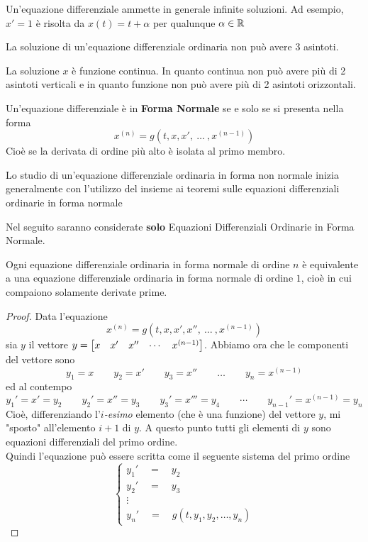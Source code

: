 \begin{example}
	\label{ex:eq_diff_inf_sol}
	Un'equazione differenziale ammette in generale infinite soluzioni. Ad esempio, $x' = 1$ è risolta da $x(t) = t + \alpha$ per qualunque $\alpha \in \mathbb{R}$
\end{example}
\begin{exercise}
	La soluzione di un'equazione differenziale ordinaria non può avere 3 asintoti.
	\begin{solution}
		La soluzione $x$ è funzione continua. In quanto continua non può avere più di 2 asintoti verticali e in quanto funzione non può avere più di 2 asintoti orizzontali.
	\end{solution}
\end{exercise}
\begin{definition}
	Un'equazione differenziale è in \textbf{Forma Normale} se e solo se si presenta nella forma 
	\[x^{(n)} = g(t,x, x',\:\dotsc\:,x^{(n-1)})\]
	Cioè se la derivata di ordine più alto è isolata al primo membro.
\end{definition}
\begin{observation}
	Lo studio di un'equazione differenziale ordinaria in forma non normale inizia generalmente con l'utilizzo del  insieme ai teoremi sulle equazioni differenziali ordinarie in forma normale
\end{observation}
\begin{note}
	Nel seguito saranno considerate \textbf{solo} Equazioni Differenziali Ordinarie in Forma Normale.
\end{note}
\begin{proposition}
	\label{prop:equaz_n_equival_1}
	Ogni equazione differenziale ordinaria in forma normale di ordine $n$ è equivalente a una equazione differenziale ordinaria in forma normale di ordine $1$, cioè in cui compaiono solamente derivate prime.
	\begin{proof}
		Data l'equazione
		\[x^{(n)} = g(t,x, x', x'',\:\dotsc\:,x^{(n-1)})\]
		sia $y$ il vettore $y = \begin{bmatrix} x &  x' &  x'' & \cdots & x^{(n-1)} \end{bmatrix}$. Abbiamo ora che le componenti del vettore sono
		\[y_1=x\qquad y_2= x'\qquad y_3= x''\qquad \dots\qquad y_n=x^{(n-1)}\]
		ed al contempo
		\[y_1'= x'=y_2\qquad y_2'= x''=y_3\qquad y_3'= x'''=y_4\qquad\cdots\qquad y_{n-1}'=x^{(n-1)}=y_n\]
		Cioè, differenziando l'$i$\textit{-esimo} elemento (che è una funzione) del vettore $y$, mi "sposto" all'elemento $i+1$ di $y$. A questo punto tutti gli elementi di $y$ sono equazioni differenziali del primo ordine.\\
		Quindi l'equazione può essere scritta come il seguente sistema del primo ordine
		\[\begin{cases}
			y_1'\quad=\quad y_2\\
			y_2'\quad=\quad y_3\\
			\vdots\\
			y_n' \quad = \quad g(t, y_1, y_2,\dots,y_n)
		\end{cases}\]
	\end{proof}
\end{proposition}
